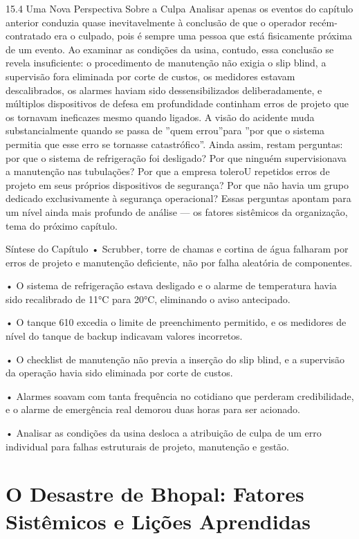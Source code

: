 15.4 Uma Nova Perspectiva Sobre a Culpa Analisar apenas os eventos do capítulo anterior conduzia quase inevitavelmente à conclusão de que o operador recém-contratado era o culpado, pois é sempre uma pessoa que está fisicamente próxima de um evento. Ao examinar as condições da usina, contudo, essa conclusão se revela insuficiente: o procedimento de manutenção não exigia o slip blind, a supervisão fora eliminada por corte de custos, os medidores estavam descalibrados, os alarmes haviam sido dessensibilizados deliberadamente, e múltiplos dispositivos de defesa em profundidade continham erros de projeto que os tornavam ineficazes mesmo quando ligados. A visão do acidente muda substancialmente quando se passa de ”quem errou”para ”por que o sistema permitia que esse erro se tornasse catastrófico”. Ainda assim, restam perguntas: por que o sistema de refrigeração foi desligado? Por que ninguém supervisionava a manutenção nas tubulações? Por que a empresa toleroU repetidos erros de projeto em seus próprios dispositivos de segurança? Por que não havia um grupo dedicado exclusivamente à segurança operacional? Essas perguntas apontam para um nível ainda mais profundo de análise — os fatores sistêmicos da organização, tema do próximo capítulo.

Síntese do Capítulo • Scrubber, torre de chamas e cortina de água falharam por erros de projeto e manutenção deficiente, não por falha aleatória de componentes.

• O sistema de refrigeração estava desligado e o alarme de temperatura havia sido recalibrado de 11°C para 20°C, eliminando o aviso antecipado.

• O tanque 610 excedia o limite de preenchimento permitido, e os medidores de nível do tanque de backup indicavam valores incorretos.

• O checklist de manutenção não previa a inserção do slip blind, e a supervisão da operação havia sido eliminada por corte de custos.

• Alarmes soavam com tanta frequência no cotidiano que perderam credibilidade, e o alarme de emergência real demorou duas horas para ser acionado.

• Analisar as condições da usina desloca a atribuição de culpa de um erro individual para falhas estruturais de projeto, manutenção e gestão.

\chapter{O Desastre de Bhopal: Fatores Sistêmicos e Lições Aprendidas}


